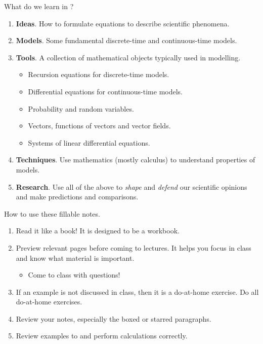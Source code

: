 \documentclass[../main.tex]{subfiles}
\begin{document}
What do we learn in \thiscourse{}?

\begin{enumerate}
  \item \textbf{Ideas}. How to formulate equations to describe scientific phenomena.

  \item \textbf{Models}. Some fundamental discrete-time and continuous-time models.

  \item \textbf{Tools}. A collection of mathematical objects typically used in modelling.
    \begin{itemize}
      \item Recursion equations for discrete-time models.
      \item Differential equations for continuous-time models.
      \item Probability and random variables.
      \item Vectors, functions of vectors and vector fields.
      \item Systems of linear differential equations.
    \end{itemize}

  \item \textbf{Techniques}. Use mathematics (mostly calculus) to understand properties of models.

  \item \textbf{Research}. Use all of the above to \emph{shape} and \emph{defend} our scientific opinions and make predictions and comparisons.
\end{enumerate}

\bigskip{}
How to use these fillable notes.
\begin{enumerate}
  \item Read it like a book! It is designed to be a workbook.
  \item Preview relevant pages before coming to lectures. It helps you focus in class and know what material is important. 
    \begin{itemize}
      \item Come to class with questions!
    \end{itemize}
  \item If an example is not discussed in class, then it is a do-at-home exercise. Do all do-at-home exercises.
  \item Review your notes, especially the boxed or starred paragraphs.
  \item Review examples to  and perform calculations correctly.
\end{enumerate}
\end{document}
